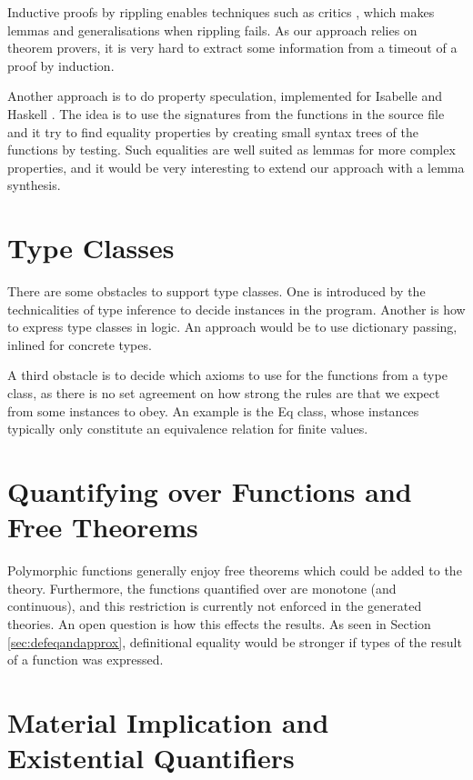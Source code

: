 Inductive proofs by rippling enables techniques such as critics
\citep{productiveuse}, which makes lemmas and generalisations when
rippling fails. As our approach relies on theorem provers, it is very
hard to extract some information from a timeout of a proof by induction.

Another approach is to do property speculation, implemented for
Isabelle \citep{isacosy} and Haskell \citep{quickspec}. The idea is to
use the signatures from the functions in the source file and it try to
find equality properties by creating small syntax trees of the
functions by testing. Such equalities are well suited as lemmas for
more complex properties, and it would be very interesting to extend
our approach with a lemma synthesis.


\section{Type Classes}
\label{sec:typeclasses}

There are some obstacles to support type classes. One is introduced by
the technicalities of type inference to decide instances in the
program. Another is how to express type classes in logic. An approach
would be to use dictionary passing, inlined for concrete types.

A third obstacle is to decide which axioms to use for the functions
from a type class, as there is no set agreement on how strong the
rules are that we expect from some instances to obey. An example
is the Eq class, whose instances typically only constitute an
equivalence relation for finite values.

\section{Quantifying over Functions and Free Theorems}

Polymorphic functions generally enjoy free theorems
\citep{freetheorems} which could be added to the theory.  Furthermore,
the functions quantified over are monotone (and continuous), and this
restriction is currently not enforced in the generated theories. An
open question is how this effects the results. As seen in Section
\ref{sec:defeqandapprox}, definitional equality would be stronger if
types of the result of a function was expressed.

\section{Material Implication and Existential Quantifiers}

